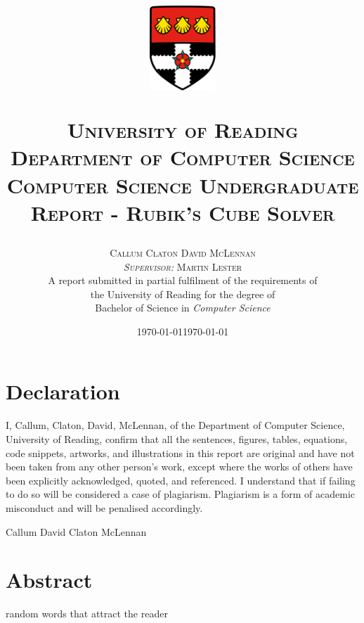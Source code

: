 \documentclass[12pt]{report} %
\title{
    \centerline{\includegraphics[width = 25mm]{Images/Uni.png}}
    \vspace{1.5cm}
    \textsc{\LARGE University of Reading}\\[0.25cm]
    \textsc{\Large Department of Computer Science}\\[1cm]
    \textsc{\large Computer Science Undergraduate Report - }
    \textsc{\large Rubik's Cube Solver}\\[0.75cm]
}
\author{
    \large
    \textsc{Callum Claton David McLennan}\\[0.25cm]
    \textsc{\normalsize \textit{Supervisor:} Martin Lester}\\[1cm]
    A report submitted in partial fulfilment of the requirements of\\the University of Reading for the degree of\\
    Bachelor of Science in \textit{Computer Science}
    \date{\today}
}
\begin{document}
\maketitle
\newpage
\section*{Declaration}
\vspace{1cm}
I, Callum, Claton, David, McLennan, of the Department of Computer Science, University of Reading, confirm that all the sentences, figures, tables, equations, code snippets, artworks, and illustrations in this report are original and have not been taken from any other person’s work, except where the works of others have been explicitly acknowledged, quoted, and referenced. I understand that if failing to do so will be considered a case of plagiarism. Plagiarism is a form of academic misconduct and will be penalised accordingly.
\vspace{1cm}
\begin{flushright}Callum David Claton McLennan \\ \date{\today}\end{flushright}
\newpage
\section*{Abstract}
random words that attract the reader


\tableofcontents
\newpage
\setcounter{page}{1}

\end{document}
